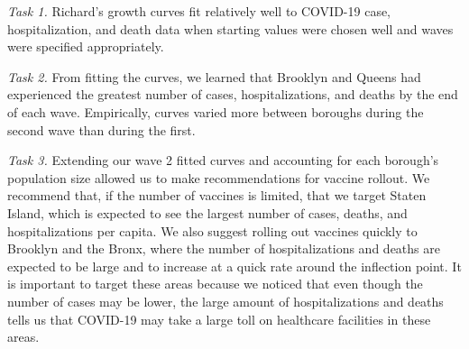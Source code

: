 \documentclass[
]{article}
\begin{document}
\emph{Task 1.} Richard's growth curves fit relatively well to COVID-19
case, hospitalization, and death data when starting values were chosen
well and waves were specified appropriately.

\emph{Task 2.} From fitting the curves, we learned that Brooklyn and
Queens had experienced the greatest number of cases, hospitalizations,
and deaths by the end of each wave. Empirically, curves varied more
between boroughs during the second wave than during the first.

\emph{Task 3.} Extending our wave 2 fitted curves and accounting for
each borough's population size allowed us to make recommendations for
vaccine rollout. We recommend that, if the number of vaccines is
limited, that we target Staten Island, which is expected to see the
largest number of cases, deaths, and hospitalizations per capita. We
also suggest rolling out vaccines quickly to Brooklyn and the Bronx,
where the number of hospitalizations and deaths are expected to be large
and to increase at a quick rate around the inflection point. It is
important to target these areas because we noticed that even though the
number of cases may be lower, the large amount of hospitalizations and
deaths tells us that COVID-19 may take a large toll on healthcare
facilities in these areas.
\end{document}
